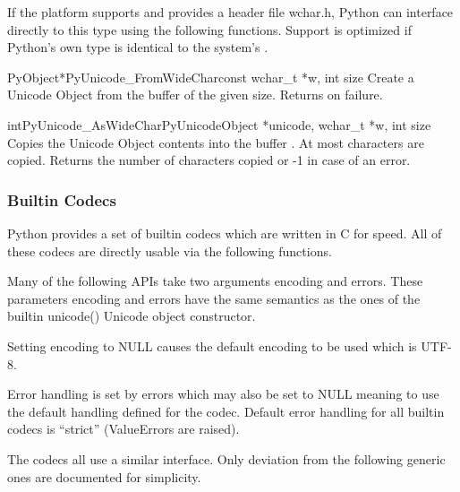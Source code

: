 \documentclass{manual}
\begin{document}

If the platform supports  and provides a header file
wchar.h, Python can interface directly to this type using the
following functions. Support is optimized if Python's own
 type is identical to the system's .

\begin{cfuncdesc}{PyObject*}{PyUnicode_FromWideChar}{const wchar_t *w,
                                                     int size}
Create a Unicode Object from the  buffer  of the
given size. Returns \NULL{} on failure.
\end{cfuncdesc}

\begin{cfuncdesc}{int}{PyUnicode_AsWideChar}{PyUnicodeObject *unicode,
                                             wchar_t *w,
                                             int size}
Copies the Unicode Object contents into the  buffer
.  At most   characters are copied.
Returns the number of  characters copied or -1 in case
of an error.
\end{cfuncdesc}


\subsubsection{Builtin Codecs \label{builtinCodecs}}

Python provides a set of builtin codecs which are written in C
for speed. All of these codecs are directly usable via the
following functions.

Many of the following APIs take two arguments encoding and
errors. These parameters encoding and errors have the same semantics
as the ones of the builtin unicode() Unicode object constructor.

Setting encoding to NULL causes the default encoding to be used which
is UTF-8.

Error handling is set by errors which may also be set to NULL meaning
to use the default handling defined for the codec. Default error
handling for all builtin codecs is ``strict'' (ValueErrors are raised).

The codecs all use a similar interface. Only deviation from the
following generic ones are documented for simplicity.

\end{document}
